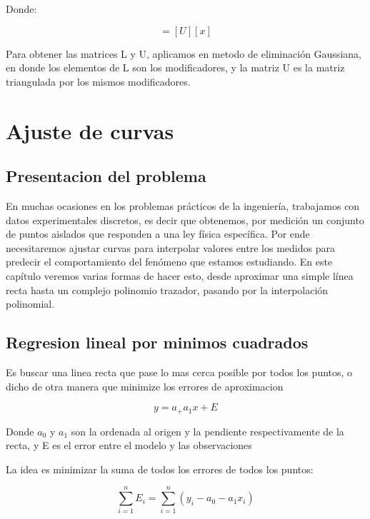 \documentclass[10pt]{article}
\begin{document}
Donde:

\begin{equation}
	[y] = [U][x]
\end{equation}

Para obtener las matrices L y U, aplicamos en metodo de eliminación Gaussiana,
en donde los elementos de L son los modificadores, y la matriz
U es la matriz triangulada por los mismos modificadores.


\pagebreak

\section{Ajuste de curvas}

\subsection{Presentacion del problema}

En muchas ocasiones en los problemas prácticos de la ingeniería, trabajamos con
datos experimentales discretos, es decir que obtenemos, por medición un conjunto de
puntos aislados que responden a una ley física específica. Por ende necesitaremos ajustar
curvas para interpolar valores entre los medidos para predecir el comportamiento del
fenómeno que estamos estudiando.
En este capítulo veremos varias formas de hacer esto, desde aproximar una simple
línea recta hasta un complejo polinomio trazador, pasando por la interpolación
polinomial.

\subsection{Regresion lineal por minimos cuadrados}

Es buscar una linea recta que pase lo mas cerca posible por todos los puntos, 
o dicho de otra manera que minimize los errores de aproximacion



\begin{equation}
	y = a_ + a_1x + E
\end{equation}

Donde $a_0$ y $a_1$ son la ordenada al origen y la pendiente respectivamente de la recta, 
y E es el error entre el modelo y las observaciones

La idea es minimizar la suma de todos los errores de todos los puntos:

\begin{equation}
	\sum_{i=1}^n E_i = \sum_{i=1}^n (y_i-a_0 - a_1x_i)
\end{equation}
\end{document}
